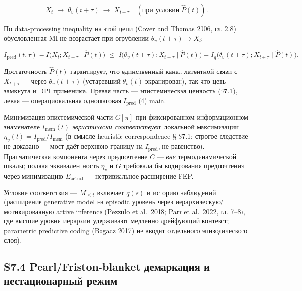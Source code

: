 \documentclass[pdflatex,sn-mathphys-ay]{sn-jnl}
\begin{document}
\[X_t \;\to\; \theta_v(t+\tau) \;\to\; X_{t+\tau} \quad (\text{при условии } \hat P(t)).\]



По data-processing inequality на этой цепи (Cover and Thomas 2006, гл. 2.8) обусловленная MI не возрастает при огрублении \(\theta_v(t+\tau) \to X_t\):



\[I_{\text{pred}}(t,\tau) = I\bigl(X_t; X_{t+\tau}\mid\hat P(t)\bigr) \;\le\; I\bigl(\theta_v(t+\tau); X_{t+\tau}\mid\hat P(t)\bigr) = I_q\bigl(\theta_v(t+\tau); X_{t+\tau} \mid \hat P(t)\bigr).\]



Достаточность \(\hat P(t)\) гарантирует, что единственный канал латентной связи с \(X_{t+\tau}\) --- через \(\theta_v(t+\tau)\) (устаревший \(\theta_v(t)\) экранирован), так что цепь замкнута и DPI применима. Правая часть --- эпистемическая ценность (S7.1); левая --- операциональная одношаговая \(I_{\text{pred}}\) (4) main.



Минимизация эпистемической части \(G[\pi]\) при фиксированном информационном знаменателе \(I_{\text{mem}}(t)\) \emph{эвристически соответствует} локальной максимизации \(\eta_v(t) = I_{\text{pred}}/I_{\text{mem}}\) (в смысле heuristic correspondence § S7.1; строгое следствие не доказано --- мост даёт верхнюю границу на \(I_{\text{pred}}\), не равенство). Прагматическая компонента через предпочтение \(C\) --- \emph{вне} термодинамической шкалы; полная эквивалентность \(\eta_v\) и \(G\) требовала бы кодирования предпочтения через минимизацию \(\dot{E}_{\text{actual}}\) --- нетривиальное расширение FEP.



Условие соответствия --- \(M_{\le t}\) включает \(q(s)\) и историю наблюдений (расширение generative model на episodic уровень через иерархическую/мотивированную active inference (Pezzulo et al.~2018; Parr et al.~2022, гл. 7--8), где высшие уровни иерархии удерживают медленно дрейфующий контекст; parametric predictive coding (Bogacz 2017) не вводит отдельного эпизодического слоя).



\subsection*{S7.4 Pearl/Friston-blanket демаркация и нестационарный режим}\label{s7.4-pearlfriston-blanket-ux434ux435ux43cux430ux440ux43aux430ux446ux438ux44f-ux438-ux43dux435ux441ux442ux430ux446ux438ux43eux43dux430ux440ux43dux44bux439-ux440ux435ux436ux438ux43c}
\end{document}
